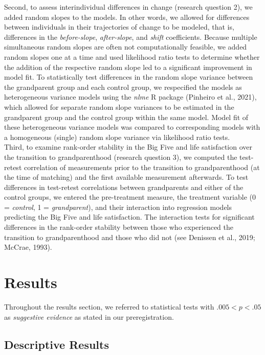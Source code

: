 \documentclass[
  english,
  man, noextraspace]{apa7}
\begin{document}
Second, to assess interindividual differences in change (research question 2), we added random slopes to the models. In other words, we allowed for differences between individuals in their trajectories of change to be modeled, that is, differences in the \emph{before-slope}, \emph{after-slope}, and \emph{shift} coefficients. Because multiple simultaneous random slopes are often not computationally feasible, we added random slopes one at a time and used likelihood ratio tests to determine whether the addition of the respective random slope led to a significant improvement in model fit. To statistically test differences in the random slope variance between the grandparent group and each control group, we respecified the models as heterogeneous variance models using the \emph{nlme} R package (Pinheiro et al., 2021), which allowed for separate random slope variances to be estimated in the grandparent group and the control group within the same model. Model fit of these heterogeneous variance models was compared to corresponding models with a homogeneous (single) random slope variance via likelihood ratio tests.\\
Third, to examine rank-order stability in the Big Five and life satisfaction over the transition to grandparenthood (research question 3), we computed the test-retest correlation of measurements prior to the transition to grandparenthood (at the time of matching) and the first available measurement afterwards. To test differences in test-retest correlations between grandparents and either of the control groups, we entered the pre-treatment measure, the treatment variable (0 = \emph{control}, 1 = \emph{grandparent}), and their interaction into regression models predicting the Big Five and life satisfaction. The interaction tests for significant differences in the rank-order stability between those who experienced the transition to grandparenthood and those who did not (see Denissen et al., 2019; McCrae, 1993).

\hypertarget{results}{%
\section{Results}\label{results}}

Throughout the results section, we referred to statistical tests with \(.005 < p < .05\) as \emph{suggestive evidence} as stated in our preregistration.

\hypertarget{descriptive-results}{%
\subsection{Descriptive Results}\label{descriptive-results}}
\end{document}
